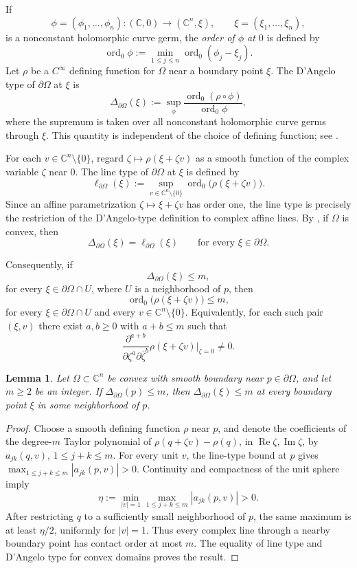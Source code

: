 \documentclass[11pt]{article}
\newtheorem{lemma}[theorem]{Lemma}
\theoremstyle{definition}
\newcommand{\C}{\mathbb{C}}
\renewcommand{\Re}{\operatorname{Re}}
\renewcommand{\Im}{\operatorname{Im}}
\DeclareMathOperator{\ord}{ord}
\begin{document}
If
\[
\phi=(\phi_1,\ldots,\phi_n):(\C,0)\longrightarrow(\C^n,\xi),\qquad \xi=(\xi_1,\ldots,\xi_n),
\]
is a nonconstant holomorphic curve germ, the \emph{order of \(\phi\) at \(0\)} is defined by
\[
\ord_0\phi:=\min_{1\le j\le n}\ord_0(\phi_j-\xi_j).
\]
Let \(\rho\) be a \(C^\infty\) defining function for \(\Omega\) near a
boundary point \(\xi\). The D'Angelo type of \(\partial\Omega\) at \(\xi\) is
\[
	\Delta_{\partial\Omega}(\xi)
	:=
	\sup_{\phi}
	\frac{\ord_0(\rho\circ\phi)}
	{\ord_0\phi},
\]
where the supremum is taken over all nonconstant holomorphic curve
germs through \(\xi\). This quantity is independent of the choice of
defining function; see \cite{DAngelo}.

For each \(v\in\C^n\setminus\{0\}\), regard \(\zeta\mapsto\rho(\xi+\zeta v)\) as a smooth function of the complex variable \(\zeta\) near \(0\). The line type of \(\partial\Omega\) at \(\xi\) is defined by
\[
\ell_{\partial\Omega}(\xi)
:=
\sup_{v\in\C^n\setminus\{0\}}
\ord_0\bigl(\rho(\xi+\zeta v)\bigr).
\]
Since an affine parametrization \(\zeta\mapsto\xi+\zeta v\) has order
one, the line type is precisely the restriction of the D'Angelo-type
definition to complex affine lines. By
\cite{McNealConvexFiniteType}, if \(\Omega\) is convex, then
\[
\Delta_{\partial\Omega}(\xi)
=
\ell_{\partial\Omega}(\xi)
\qquad
\text{for every }\xi\in\partial\Omega.
\]

Consequently, if
\[
\Delta_{\partial\Omega}(\xi)\le m,
\]
for every \(\xi\in\partial\Omega\cap U\), where \(U\) is a neighborhood of
\(p\), then
\[
\ord_0\bigl(\rho(\xi+\zeta v)\bigr)\le m,
\]
for every \(\xi\in\partial\Omega\cap U\) and every \(v\in\C^n\setminus\{0\}\).
Equivalently, for each such pair \((\xi,v)\) there exist
\(a,b\geq0\) with \(a+b\leq m\) such that
\[
	\frac{\partial^{a+b}}
	{\partial\zeta^a\partial\bar\zeta^b}
	\rho(\xi+\zeta v)\bigg|_{\zeta=0}\neq0.
\]

\begin{lemma}\label{lem:local-type-bound}
Let \(\Omega\subset\C^n\) be convex with smooth boundary near
\(p\in\partial\Omega\), and let \(m\ge2\) be an integer.
If \(\Delta_{\partial\Omega}(p)\le m\),
then \(\Delta_{\partial\Omega}(\xi)\le m\) at every boundary point
\(\xi\) in some neighborhood of \(p\).
\end{lemma}
\begin{proof}
Choose a smooth defining function \(\rho\) near \(p\), and denote
the coefficients of the degree-\(m\) Taylor polynomial of
\(\rho(q+\zeta v)-\rho(q)\), in \(\Re\zeta,\Im\zeta\), by
\(a_{jk}(q,v)\), \(1\le j+k\le m\).
For every unit \(v\), the line-type bound at \(p\) gives
\(\max_{1\le j+k\le m}|a_{jk}(p,v)|>0\).
Continuity and compactness of the unit sphere imply
\[
\eta:=\min_{|v|=1}\max_{1\le j+k\le m}|a_{jk}(p,v)|>0.
\]
After restricting \(q\) to a sufficiently small neighborhood of \(p\),
the same maximum is at least \(\eta/2\), uniformly for \(|v|=1\).
Thus every complex line through a nearby boundary point has contact
order at most \(m\). The equality of line type and D'Angelo type
for convex domains proves the result.
\end{proof}
\end{document}
